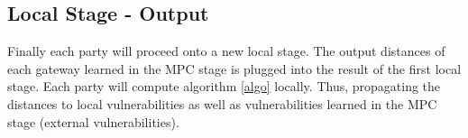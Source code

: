 \subsection{Local Stage - Output}
Finally each party will proceed onto a new local stage. The output distances of each gateway learned in the MPC stage is plugged into the result of the first local stage. Each party will compute algorithm \ref{algo} locally. Thus, propagating the distances to local vulnerabilities as well as vulnerabilities learned in the MPC stage (external vulnerabilities).
